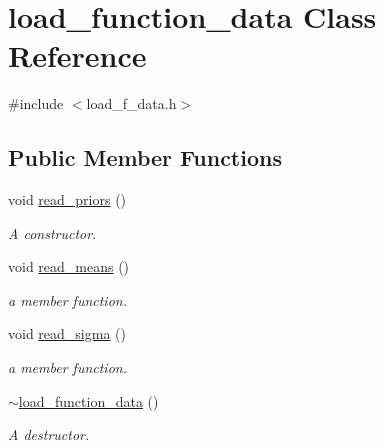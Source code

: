 \hypertarget{classload__function__data}{\section{load\-\_\-function\-\_\-data \-Class \-Reference}
\label{classload__function__data}
}


{\ttfamily \#include $<$load\-\_\-f\-\_\-data.\-h$>$}

\subsection*{\-Public \-Member \-Functions}
\begin{DoxyCompactItemize}
\item 
void \hyperlink{classload__function__data_a642d59527bc9b92f3a7133f286b2a586}{read\-\_\-priors} ()
\begin{DoxyCompactList}\small\item\em \-A constructor. \end{DoxyCompactList}\item 
\hypertarget{classload__function__data_a71a30364a1c8cb22ea6219d7738eb7bb}{void \hyperlink{classload__function__data_a71a30364a1c8cb22ea6219d7738eb7bb}{read\-\_\-means} ()}\label{classload__function__data_a71a30364a1c8cb22ea6219d7738eb7bb}

\begin{DoxyCompactList}\small\item\em a member function. \end{DoxyCompactList}\item 
\hypertarget{classload__function__data_af43ee0e56debf23d34079303eb62feb3}{void \hyperlink{classload__function__data_af43ee0e56debf23d34079303eb62feb3}{read\-\_\-sigma} ()}\label{classload__function__data_af43ee0e56debf23d34079303eb62feb3}

\begin{DoxyCompactList}\small\item\em a member function. \end{DoxyCompactList}\item 
\hyperlink{classload__function__data_a14146a95da58d70c196b76210809c2ed}{$\sim$load\-\_\-function\-\_\-data} ()
\begin{DoxyCompactList}\small\item\em \-A destructor. \end{DoxyCompactList}\end{DoxyCompactItemize}
